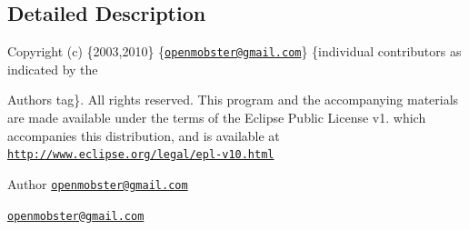 \subsection{\-Detailed \-Description}
\-Copyright (c) \{2003,2010\} \{\href{mailto:openmobster@gmail.com}{\tt openmobster@gmail.\-com}\} \{individual contributors as indicated by the \begin{DoxyAuthor}{\-Authors}
tag\}. \-All rights reserved. \-This program and the accompanying materials are made available under the terms of the \-Eclipse \-Public \-License v1. which accompanies this distribution, and is available at \href{http://www.eclipse.org/legal/epl-v10.html}{\tt http\-://www.\-eclipse.\-org/legal/epl-\/v10.\-html}
\end{DoxyAuthor}
\begin{DoxyAuthor}{\-Author}
\href{mailto:openmobster@gmail.com}{\tt openmobster@gmail.\-com}

\href{mailto:openmobster@gmail.com}{\tt openmobster@gmail.\-com} 
\end{DoxyAuthor}



